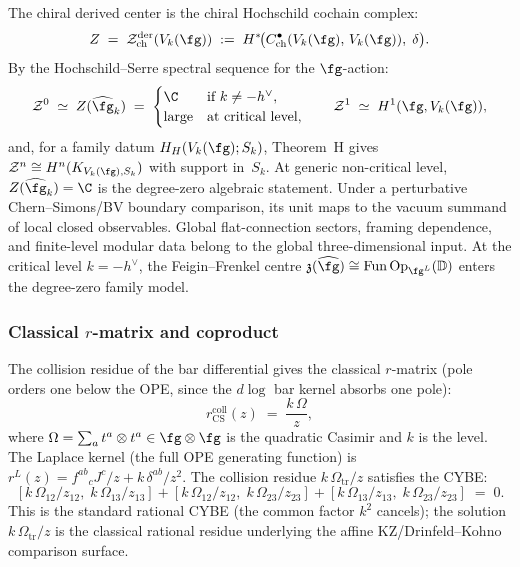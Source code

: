 The chiral derived center is the chiral Hochschild cochain
complex:
\begin{equation}\label{eq:cs-derived-center}
Z
\;=\;
\mathcal{Z}^{\mathrm{der}}_{\mathrm{ch}}(V_k(\fg))
\;:=\;
H^*\!\bigl(
 C^\bullet_{\mathrm{ch}}(V_k(\fg),\, V_k(\fg)),\;
 \delta
\bigr).
\end{equation}
By the Hochschild--Serre spectral sequence for the
$\fg$-action:
\begin{equation}\label{eq:cs-hochschild-computation}
\mathcal{Z}^0
\;\simeq\;
Z(\widehat{\fg}_k)
\;=\;
\begin{cases}
\C & \text{if } k \ne -h^\vee, \\
\text{large} & \text{at critical level},
\end{cases}
\qquad
\mathcal{Z}^1
\;\simeq\;
H^1(\fg, V_k(\fg)),
\end{equation}
and, for a family datum $H_H(V_k(\fg);S_k)$, Theorem~H gives
$\mathcal Z^n\cong H^n(K_{V_k(\fg),S_k})$ with support in~$S_k$.
At generic non-critical level, $Z(\widehat{\fg}_k)=\C$ is the
degree-zero algebraic statement.  Under a perturbative
Chern--Simons/BV boundary comparison, its unit maps to the vacuum
summand of local closed observables.  Global flat-connection sectors,
framing dependence, and finite-level modular data belong to the
global three-dimensional input.  At the critical level
$k=-h^\vee$, the Feigin--Frenkel centre
$\mathfrak z(\widehat\fg)\cong
\operatorname{Fun}\operatorname{Op}_{\fg^L}(\mathbb D)$ enters the
degree-zero family model.

\subsubsection*{Classical $r$-matrix and coproduct}

The collision residue of the bar differential gives the
classical $r$-matrix (pole orders one below the OPE, since the $d\log$ bar kernel absorbs one pole):
\begin{equation}\label{eq:cs-r-matrix}
r^{\mathrm{coll}}_{\mathrm{CS}}(z)
\;=\;
\frac{k\,\Omega}{z},
\end{equation}
where $\Omega = \sum_a t^a \otimes t^a \in \fg \otimes \fg$ is the
quadratic Casimir and $k$ is the level.
The Laplace kernel (the full OPE generating function) is
$r^L(z) = f^{ab}{}_c J^c/z + k\,\delta^{ab}/z^2$.
The collision residue $k\,\Omega_{\mathrm{tr}}/z$ satisfies the CYBE:
\begin{equation}\label{eq:cs-cybe}
[k\,\Omega_{12}/z_{12},\; k\,\Omega_{13}/z_{13}]
+ [k\,\Omega_{12}/z_{12},\; k\,\Omega_{23}/z_{23}]
+ [k\,\Omega_{13}/z_{13},\; k\,\Omega_{23}/z_{23}]
\;=\; 0.
\end{equation}
This is the standard rational CYBE (the common factor $k^2$ cancels); the solution $k\,\Omega_{\mathrm{tr}}/z$
is the classical rational residue underlying the affine
KZ/Drinfeld--Kohno comparison surface.

